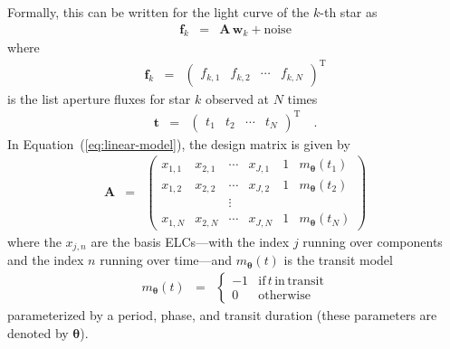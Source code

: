 \documentclass[12pt,preprint]{aastex}
\newcommand{\Eq}[1]{Equation~(\ref{eq:#1})}
\newcommand{\eq}[1]{\Eq{#1}}
\newcommand{\eqlabel}[1]{\label{eq:#1}}
\newcommand{\T}{\ensuremath{\mathrm{T}}}
\newcommand{\bvec}[1]{{\ensuremath{\boldsymbol{#1}}}}
\begin{document}
Formally, this can be written for the light curve of the $k$-th star as
\begin{eqnarray}\eqlabel{linear-model}
\bvec{f}_k &=& \bvec{A}\,\bvec{w}_k + \mathrm{noise}
\end{eqnarray}
where
\begin{eqnarray}
\bvec{f}_k &=& \left (\begin{array}{cccc}
    f_{k,1} & f_{k,2} & \cdots & f_{k,N}
\end{array}\right )^\T
\end{eqnarray}
is the list aperture fluxes for star $k$ observed at $N$ times
\begin{eqnarray}
\bvec{t} &=& \left (\begin{array}{cccc}
    t_{1} & t_{2} & \cdots & t_{N}
\end{array}\right )^\T \quad.
\end{eqnarray}
In \eq{linear-model}, the design matrix is given by
\begin{eqnarray}
\bvec{A} &=& \left (\begin{array}{cccccc}
    x_{1,1} & x_{2,1} & \cdots & x_{J,1} & 1 & m_\bvec{\theta}(t_1) \\
    x_{1,2} & x_{2,2} & \cdots & x_{J,2} & 1 & m_\bvec{\theta}(t_2) \\
    && \vdots &&&\\
    x_{1,N} & x_{2,N} & \cdots & x_{J,N} & 1 & m_\bvec{\theta}(t_N)
\end{array}\right )
\end{eqnarray}
where the $x_{j,n}$ are the basis ELCs---with the index $j$ running over
components and the index $n$ running over time---and $m_\bvec{\theta}(t)$ is
the transit model
\begin{eqnarray}
m_\bvec{\theta}(t) &=& \left\{\begin{array}{cl}
-1 & \mathrm{if\,}t\,\mathrm{in\,transit} \\
0 & \mathrm{otherwise}
\end{array}\right.
\end{eqnarray}
parameterized by a period, phase, and transit duration (these parameters are
denoted by \bvec{\theta}).
\end{document}
